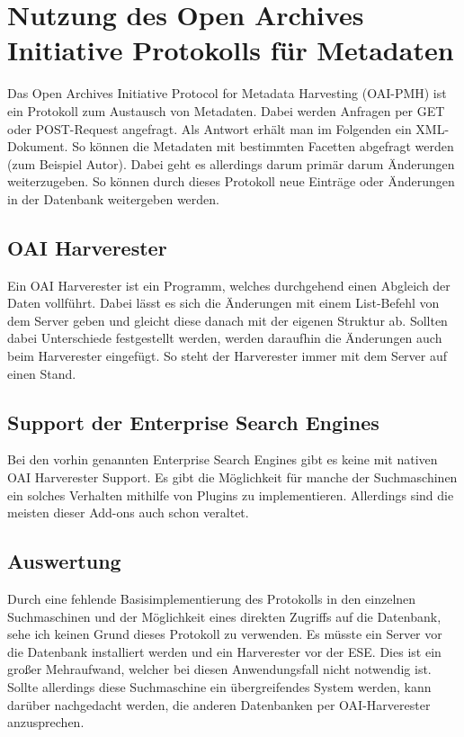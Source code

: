 \chapter{Nutzung des Open Archives Initiative Protokolls für Metadaten}

Das Open Archives Initiative Protocol for Metadata Harvesting (OAI-PMH) ist ein Protokoll zum Austausch von Metadaten. Dabei werden Anfragen per GET oder POST-Request angefragt. Als Antwort erhält man im Folgenden ein XML-Dokument. So können die Metadaten mit bestimmten Facetten abgefragt werden (zum Beispiel Autor). Dabei geht es allerdings darum primär darum Änderungen weiterzugeben. So können durch dieses Protokoll neue Einträge oder Änderungen in der Datenbank weitergeben werden.
\cite{DeutscheNationalBibliothek.2019}

\section{OAI Harverester}

Ein OAI Harverester ist ein Programm, welches durchgehend einen Abgleich der Daten vollführt. Dabei lässt es sich die Änderungen mit einem List-Befehl von dem Server geben und gleicht diese danach mit der eigenen Struktur ab. Sollten dabei Unterschiede festgestellt werden, werden daraufhin die Änderungen auch beim Harverester eingefügt. So steht der Harverester immer mit dem Server auf einen Stand.
\cite{DeutscheNationalBibliothek.2019}

\section{Support der Enterprise Search Engines}

Bei den vorhin genannten Enterprise Search Engines gibt es keine mit nativen OAI Harverester Support. Es gibt die Möglichkeit für manche der Suchmaschinen ein solches Verhalten mithilfe von Plugins zu implementieren. Allerdings sind die meisten dieser Add-ons auch schon veraltet.

\section{Auswertung}

Durch eine fehlende Basisimplementierung des Protokolls in den einzelnen Suchmaschinen und der Möglichkeit eines direkten Zugriffs auf die Datenbank, sehe ich keinen Grund dieses Protokoll zu verwenden. Es müsste ein Server vor die Datenbank installiert werden und ein Harverester vor der ESE. Dies ist ein großer Mehraufwand, welcher bei diesen Anwendungsfall nicht notwendig ist. Sollte allerdings diese Suchmaschine ein übergreifendes System werden, kann darüber nachgedacht werden, die anderen Datenbanken per OAI-Harverester anzusprechen.